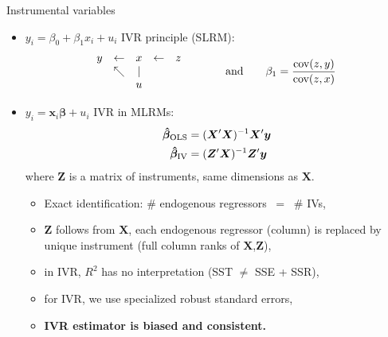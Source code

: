 \documentclass[usenames,dvipsnames]{beamer}
\begin{document}
\begin{frame}{Instrumental variables}
\begin{itemize}
    \item $y_i = \beta_0 + \beta_1 x_i + u_i$ \qquad IVR principle (SLRM):
    $$
    \begin{matrix}
    y & \leftarrow & x & \leftarrow & z \\
      & \nwarrow & | & &\\
      & & u & &
    \end{matrix}
    \qquad \qquad \textnormal{and} \qquad
   \beta_1 = \frac{\textnormal{cov}(z,y)}{\textnormal{cov}(z,x)}
    $$
    \item $y_i = \bm{x}_i \bm{\beta} + u_i$ \qquad IVR in MLRMs:
    \begin{align*}
    \bm{\hat{\beta}}_{\textnormal{OLS}} &= 
    (\bm{X}^{\prime}\bm{X})^{-1} \bm{X}^{\prime}\bm{y} \\
    \bm{\hat{\beta}}_{\textnormal{IV}} &= 
    (\bm{Z}^{\prime}\bm{X})^{-1} \bm{Z}^{\prime}\bm{y}
    \end{align*}
    where $\bm{Z}$ is a matrix of instruments, same dimensions as $\bm{X}$.
    \small{
    \begin{itemize}
        \item Exact identification: \# endogenous regressors~ =~ \# IVs,
        \item $\bm{Z}$ follows from $\bm{X}$, each endogenous regressor (column) is replaced by unique instrument (full column ranks of $\bm{X}$,$\bm{Z}$),
        \item in IVR, $R^2$ has no interpretation (SST $\neq$ SSE + SSR),
        \item for IVR, we use specialized robust standard errors,
        \item \textbf{IVR estimator is biased and consistent.}
    \end{itemize}
    }
\end{itemize}
\end{frame}
\end{document}
